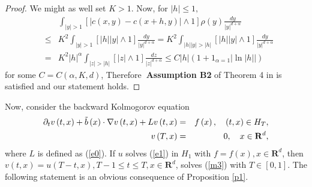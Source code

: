 \documentclass[11pt]{amsart}
\theoremstyle{plain}
\numberwithin{equation}{section}
\begin{document}
\begin{proof}
We might as well set $K>1$. Now, for $\left\vert h\right\vert \leq 1,$ 
\begin{eqnarray*}
&&\int_{\left\vert y\right\vert >1}\left[ \left\vert c\left( x,y\right)
-c\left( x+h,y\right) \right\vert \wedge 1\right] \rho \left( y\right) \frac{dy}{\left\vert y\right\vert ^{d+\alpha }} \\
&\leq &K^{2}\int_{\left\vert y\right\vert >1}\left[ \left\vert h\right\vert
\left\vert y\right\vert \wedge 1\right] \frac{dy}{\left\vert y\right\vert
^{d+\alpha }}=K^{2}\int_{\left\vert h\right\vert \left\vert y\right\vert
>\left\vert h\right\vert }\left[ \left\vert h\right\vert \left\vert
y\right\vert \wedge 1\right] \frac{dy}{\left\vert y\right\vert ^{d+\alpha }}
\\
&=&K^{2}\left\vert h\right\vert ^{\alpha }\int_{\left\vert z\right\vert
>\left\vert h\right\vert }\left[ \left\vert z\right\vert \wedge 1\right] 
\frac{dz}{\left\vert z\right\vert ^{d+\alpha }}\leq C\left\vert h\right\vert
\left( 1+1_{\alpha =1}\left\vert \ln \left\vert h\right\vert \right\vert
\right)
\end{eqnarray*}for some $C=C\left( \alpha,K,d\right)$, Therefore\textbf{\ Assumption B2} of
Theorem 4 in \cite{mp1} is satisfied and our statement holds.
\end{proof}

Now, consider the backward Kolmogorov equation 
\begin{eqnarray}
\partial _{t}v\left( t,x\right) +\tilde{b}\left( x\right) \cdot \nabla
v\left( t,x\right) +Lv\left( t,x\right) &=&f\left( x\right) ,\quad (t,x)\in
H_{T},  \label{m3} \\
v\left( T,x\right) &=&0,\quad x\in \mathbf{R}^{d},  \notag
\end{eqnarray}where $L$ is defined as (\ref{e0}). If $u$ solves (\ref{e1}) in $H_{1}$ with 
$f=f\left( x\right) ,x\in \mathbf{R}^{d}$, then $v\left( t,x\right) =u\left(
T-t,x\right) ,T-1\leq t\leq T,x\in \mathbf{R}^{d}$, solves (\ref{m3}) with $T\in \left[ 0,1\right] $. The following statement is an obvious consequence
of Proposition \ref{p1}.
\end{document}
